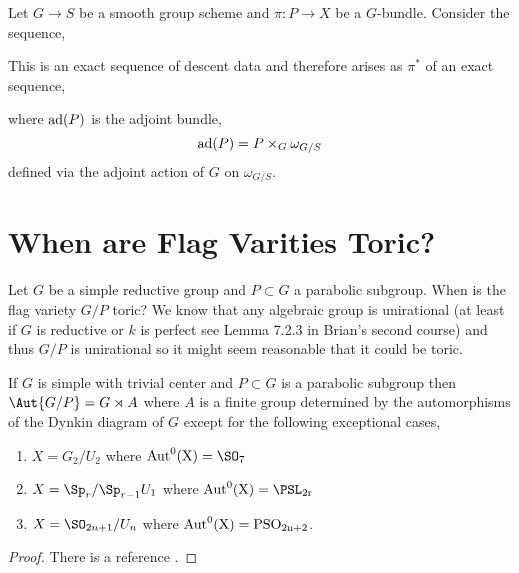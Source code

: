 \documentclass[12pt]{article}
\begin{document}
\begin{prop}
Let $G \to S$ be a smooth group scheme and $\pi : P \to X$ be a $G$-bundle. Consider the sequence,
\begin{center}
\end{center}
This is an exact sequence of descent data and therefore arises as $\pi^*$ of an exact sequence,
\begin{center}
\end{center}
where $\mathrm{ad}(P)$ is the adjoint bundle,
\[ \mathrm{ad}(P) = P \times_G \omega_{G/S} \]
defined via the adjoint action of $G$ on $\omega_{G/S}$. 
\end{prop}

\section{When are Flag Varities Toric?}

Let $G$ be a simple reductive group and $P \subset G$ a parabolic subgroup. When is the flag variety $G / P$ toric? We know that any algebraic group is unirational (at least if $G$ is reductive or $k$ is perfect see Lemma 7.2.3 in Brian's second course) and thus $G/P$ is unirational so it might seem reasonable that it could be toric. 


\begin{prop}
If $G$ is simple with trivial center and $P \subset G$ is a parabolic subgroup then $\Aut{G/P} = G \rtimes A$ where $A$ is a finite group determined by the automorphisms of the Dynkin diagram of $G$ except for the following exceptional cases,
\begin{enumerate}
\item $X = G_2 / U_2$ where $\rm{Aut}^0(X) = \SO_7$

\item $X = \Sp_{r} / \Sp_{r-1} U_1$ where $\rm{Aut}^0(X) = \PSL_{2r}$

\item $X = \SO_{2n+1} / U_n$ where $\rm{Aut}^0(X) = \mathrm{PSO}_{2n + 2}$.
\end{enumerate}
\end{prop}

\begin{proof}
There is a reference .
\end{proof}
\end{document}
